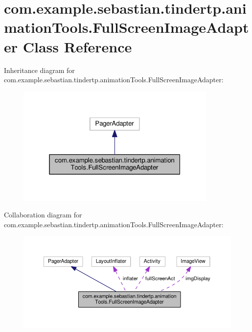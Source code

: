 \hypertarget{classcom_1_1example_1_1sebastian_1_1tindertp_1_1animationTools_1_1FullScreenImageAdapter}{}\section{com.\+example.\+sebastian.\+tindertp.\+animation\+Tools.\+Full\+Screen\+Image\+Adapter Class Reference}
\label{classcom_1_1example_1_1sebastian_1_1tindertp_1_1animationTools_1_1FullScreenImageAdapter}


Inheritance diagram for com.\+example.\+sebastian.\+tindertp.\+animation\+Tools.\+Full\+Screen\+Image\+Adapter\+:\nopagebreak
\begin{figure}[H]
\begin{center}
\leavevmode
\includegraphics[width=280pt]{classcom_1_1example_1_1sebastian_1_1tindertp_1_1animationTools_1_1FullScreenImageAdapter__inherit__graph}
\end{center}
\end{figure}


Collaboration diagram for com.\+example.\+sebastian.\+tindertp.\+animation\+Tools.\+Full\+Screen\+Image\+Adapter\+:\nopagebreak
\begin{figure}[H]
\begin{center}
\leavevmode
\includegraphics[width=350pt]{classcom_1_1example_1_1sebastian_1_1tindertp_1_1animationTools_1_1FullScreenImageAdapter__coll__graph}
\end{center}
\end{figure}
